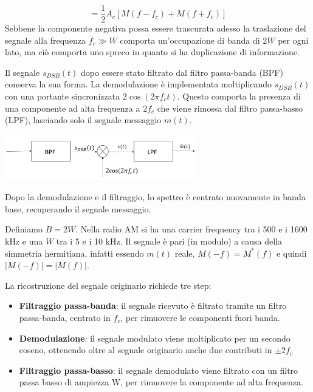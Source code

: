 \[
    = \frac{1}{2} A_c [M(f - f_c) + M(f + f_c)]
\]
Sebbene la componente negativa possa essere trascurata adesso la traslazione del segnale alla frequenza $f_c \gg W$ comporta un'occupazione di banda di $2W$ per ogni lato, ma ciò comporta uno spreco in quanto si ha duplicazione di informazione.

\begin{center}
    
\end{center}


Il segnale \( s_{DSB}(t) \) dopo essere stato filtrato dal filtro passa-banda (BPF) conserva la sua forma.
La demodulazione è implementata moltiplicando \( s_{DSB}(t) \) con una portante sincronizzata \( 2\cos(2\pi f_c t) \).
Questo comporta la presenza di una componente ad alta frequenza a \( 2f_c \) che viene rimossa dal filtro passa-basso (LPF), lasciando solo il segnale messaggio \( m(t) \).
\begin{center}
    \includegraphics[width=0.625\textwidth]{imgs/analog_pam_receiver.png}
\end{center}

Dopo la demodulazione e il filtraggio, lo spettro è centrato nuovamente in banda base, recuperando il segnale messaggio.

Definiamo $B = 2W$.
Nella radio AM si ha una carrier frequency tra i 500 e i 1600 kHz e una $W$ tra i 5 e i 10 kHz.
Il segnale è pari (in modulo) a causa della simmetria hermitiana, infatti essendo $m(t)$ reale, $M(-f) = M^*(f)$ e quindi $|M(-f)| = |M(f)|$.


La ricostruzione del segnale originario richiede tre step:
\begin{itemize}
    \item \textbf{Filtraggio passa-banda}: il segnale ricevuto è filtrato tramite un filtro passa-banda, centrato in \( f_c \), per rimuovere le componenti fuori banda.
    \item \textbf{Demodulazione}: il segnale modulato viene moltiplicato per un secondo coseno, ottenendo oltre al segnale originario anche due contributi in \(\pm 2f_c \)
    \item \textbf{Filtraggio passa-basso}: il segnale demodulato viene filtrato con un filtro passa basso di ampiezza W, per rimuovere la componente ad alta frequenza.
\end{itemize}

